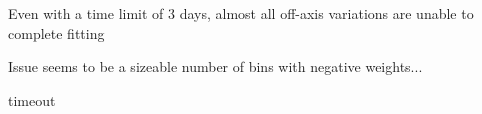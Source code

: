 {
    Even with a time limit of 3 days, almost all off-axis variations are unable to complete fitting

    \vspace{5mm}
    Issue seems to be a sizeable number of bins with negative weights...
}{timeout}


